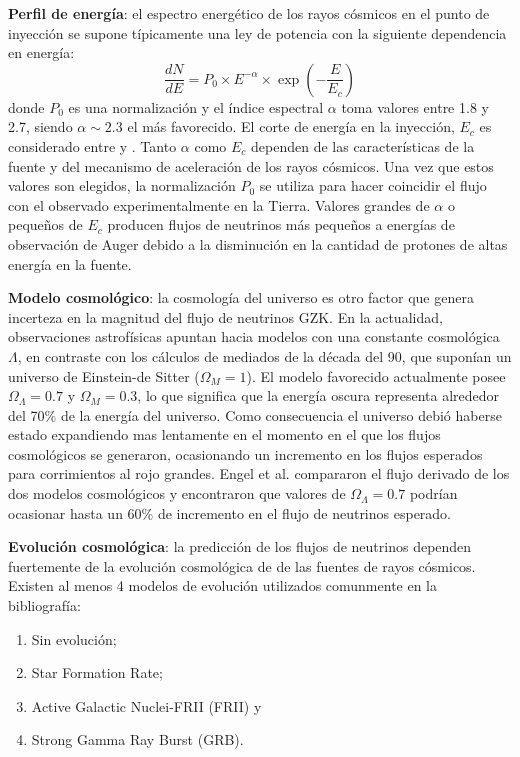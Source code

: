 	\textbf{Perfil de energ\'ia}: el espectro energ\'etico de los rayos c\'osmicos en el punto de inyecci\'on se supone t\'ipicamente una ley de potencia con la siguiente dependencia en energ\'ia:
	\begin{equation}
		\frac{dN}{dE}=P_{0} \times E^{-\alpha} \times \exp{(-\frac{E}{E_{c}})}
	\end{equation}
	donde $P_0$ es una normalizaci\'on y el \'indice espectral $\alpha$ toma valores entre 1.8 y 2.7, siendo $\alpha\sim2.3$ el m\'as favorecido.
	El corte de energ\'ia en la inyecci\'on, $E_c$ es considerado entre  y .
	Tanto $\alpha$ como $E_c$ dependen de las caracter\'isticas de la fuente y del mecanismo de aceleraci\'on de los rayos c\'osmicos.
	Una vez que estos valores son elegidos, la normalizaci\'on $P_0$ se utiliza para hacer coincidir el flujo con el observado experimentalmente en la Tierra.
	Valores grandes de $\alpha$ o peque\~nos de $E_c$ producen flujos de neutrinos m\'as peque\~nos a energ\'ias de observaci\'on de Auger debido a la disminuci\'on en la cantidad de protones de altas energ\'ia en la fuente.
	
	\textbf{Modelo cosmol\'ogico}: la cosmolog\'ia del universo es otro factor que genera incerteza en la magnitud del flujo de neutrinos GZK. 
	En la actualidad, observaciones astrof\'isicas apuntan hacia modelos con una constante cosmol\'ogica $\Lambda$\cite{cite:Lambda}, en contraste con los c\'alculos de mediados de la d\'ecada del 90, que supon\'ian un universo de Einstein-de Sitter ($\Omega_{M}=1$). 
	El modelo favorecido actualmente posee $\Omega_{\Lambda}=0.7$ y $\Omega_{M}=0.3$\cite{cite:LambdaM}, lo que significa que la energ\'ia oscura representa alrededor del 70\% de la energ\'ia del universo.
	Como consecuencia el universo debi\'o haberse estado expandiendo mas lentamente en el momento en el que los flujos cosmol\'ogicos se generaron, ocasionando un incremento en los flujos esperados para corrimientos al rojo grandes.
	Engel et al. \cite{cite:nuEngel} compararon el flujo derivado de los dos modelos cosmol\'ogicos y encontraron que valores de $\Omega_{\Lambda}=0.7$ podr\'ian ocasionar hasta un 60\% de incremento en el flujo de neutrinos esperado.
	
	\textbf{Evoluci\'on cosmol\'ogica}: la predicci\'on de los flujos de neutrinos dependen fuertemente de la evoluci\'on cosmol\'ogica de de las fuentes de rayos c\'osmicos.
	Existen al menos 4 modelos de evoluci\'on utilizados comunmente en la bibliograf\'ia:
	\begin{enumerate}
	 \item Sin evoluci\'on;
	 \item Star Formation Rate;
	 \item Active Galactic Nuclei-FRII (FRII) y
	 \item Strong Gamma Ray Burst (GRB).
	\end{enumerate}
	
